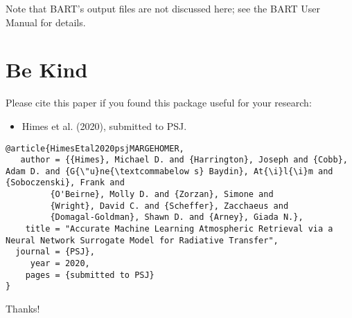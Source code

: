 \documentclass[letterpaper, 12pt]{article}
\begin{document}
\noindent Note that BART's output files are not discussed here; see the BART 
User Manual for details.



\section{Be Kind}
\label{sec:bekind}
Please cite this paper if you found this package useful for your
research:

\begin{itemize}
\item Himes et al. (2020), submitted to PSJ.
\end{itemize}

\begin{verbatim}
@article{HimesEtal2020psjMARGEHOMER,
   author = {{Himes}, Michael D. and {Harrington}, Joseph and {Cobb}, Adam D. and {G{\"u}ne{\textcommabelow s} Baydin}, At{\i}l{\i}m and {Soboczenski}, Frank and
         {O'Beirne}, Molly D. and {Zorzan}, Simone and
         {Wright}, David C. and {Scheffer}, Zacchaeus and
         {Domagal-Goldman}, Shawn D. and {Arney}, Giada N.},
    title = "Accurate Machine Learning Atmospheric Retrieval via a Neural Network Surrogate Model for Radiative Transfer",
  journal = {PSJ},
     year = 2020,
    pages = {submitted to PSJ}
}
\end{verbatim}

\noindent Thanks!


\end{document}
